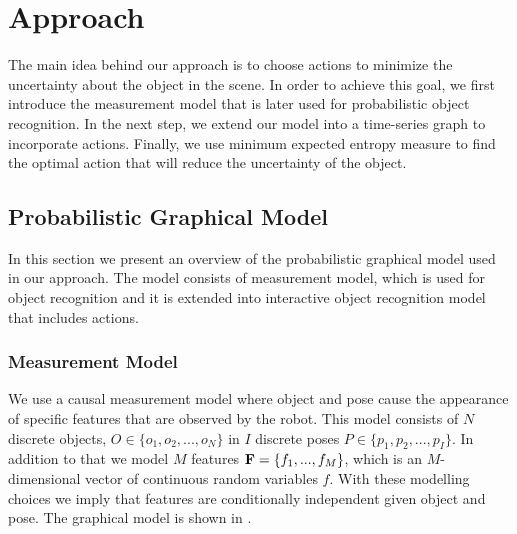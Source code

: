 \section{Approach}

The main idea behind our approach is to choose actions to minimize the uncertainty about the object in the scene. In order to achieve this goal, we first introduce the measurement model that is later used for probabilistic object recognition. In the next step, we extend our model into a time-series graph to incorporate actions. Finally, we use minimum expected entropy measure to find the optimal action that will reduce the uncertainty of the object.

    \subsection{Probabilistic Graphical Model}
		In this section we present an overview of the probabilistic graphical model used in our approach. The model consists of measurement model, which is used for object recognition and it is extended into interactive object recognition model that includes actions.  
            
        \subsubsection{Measurement Model}
            We use a causal measurement model where object and pose cause the appearance of specific features that are observed by the robot. This model consists of $N$ discrete objects, $O \in \{o_1,o_2, ..., o_N\}$ in $I$ discrete poses $P \in \{p_1,p_2, ..., p_I\}$. In addition to that we model $M$ features $\mathbf{F} = \left\{ f_1, ...,  f_M\right\}$, which is an $M$-dimensional vector of continuous random variables $f$. With these modelling choices we imply that features are conditionally independent given object and pose. The graphical model is shown in .

